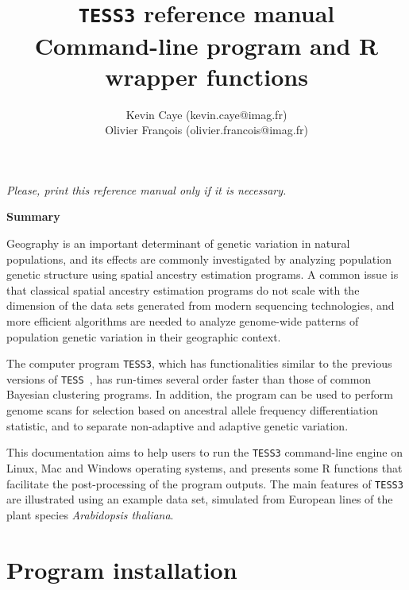 \documentclass[10pt,a4paper]{article}
\title{{\tt TESS3} reference manual \\
Command-line program and R wrapper functions
}
\author{
        Kevin Caye (kevin.caye@imag.fr)\\
        Olivier Fran\c cois (olivier.francois@imag.fr)\\
}
\begin{document}
\maketitle
\begin{center}
{\it Please, print this reference manual only if it is necessary.}
\end{center}

\vspace{.5cm}

\begin{center} {\bf Summary}
\end{center}


\vspace{.5cm}

Geography is an important determinant of genetic variation in natural populations, and its effects are commonly investigated by analyzing population genetic structure using spatial ancestry estimation programs. A common issue is that classical spatial ancestry estimation programs do not scale with the dimension of the data sets generated from modern sequencing technologies, and more efficient algorithms are needed to analyze genome-wide patterns of population genetic variation in their geographic context.

The computer program {\tt TESS3}, which has functionalities similar to the previous versions of {\tt TESS}~\cite{chen2007bayesian,durand2009spatial}, has run-times several order faster than those of common Bayesian clustering programs. In addition, the program can be used to perform genome scans for selection based on ancestral allele frequency differentiation statistic, and to separate non-adaptive and adaptive genetic variation.

This documentation aims to help users to run the {\tt TESS3} command-line engine on Linux, Mac and Windows operating systems, and presents some R functions that facilitate the post-processing of the program outputs. The main features of {\tt TESS3} are illustrated using an example data set, simulated from European lines of the plant species {\it Arabidopsis thaliana}.

\vspace{.5cm}


\section{Program installation} 
\end{document}
